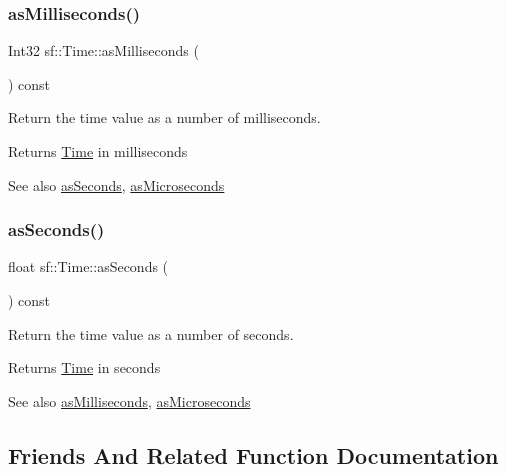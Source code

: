 \subsubsection{\texorpdfstring{as\+Milliseconds()}{asMilliseconds()}}
{\footnotesize\ttfamily Int32 sf\+::\+Time\+::as\+Milliseconds (\begin{DoxyParamCaption}{ }\end{DoxyParamCaption}) const}



Return the time value as a number of milliseconds. 

\begin{DoxyReturn}{Returns}
\hyperlink{classsf_1_1_time}{Time} in milliseconds
\end{DoxyReturn}
\begin{DoxySeeAlso}{See also}
\hyperlink{classsf_1_1_time_aa3df2f992d0b0041b4eb02258d43f0e3}{as\+Seconds}, \hyperlink{classsf_1_1_time_a000c2c64b74658ebd228b9294a464275}{as\+Microseconds} 
\end{DoxySeeAlso}
\mbox{\label{classsf_1_1_time_aa3df2f992d0b0041b4eb02258d43f0e3}} 
\subsubsection{\texorpdfstring{as\+Seconds()}{asSeconds()}}
{\footnotesize\ttfamily float sf\+::\+Time\+::as\+Seconds (\begin{DoxyParamCaption}{ }\end{DoxyParamCaption}) const}



Return the time value as a number of seconds. 

\begin{DoxyReturn}{Returns}
\hyperlink{classsf_1_1_time}{Time} in seconds
\end{DoxyReturn}
\begin{DoxySeeAlso}{See also}
\hyperlink{classsf_1_1_time_aa16858ca030a07eb18958c321f256e5a}{as\+Milliseconds}, \hyperlink{classsf_1_1_time_a000c2c64b74658ebd228b9294a464275}{as\+Microseconds} 
\end{DoxySeeAlso}


\subsection{Friends And Related Function Documentation}
\mbox{\label{classsf_1_1_time_a951fd7219641f1e8191887f5dfe0dc31}} 
